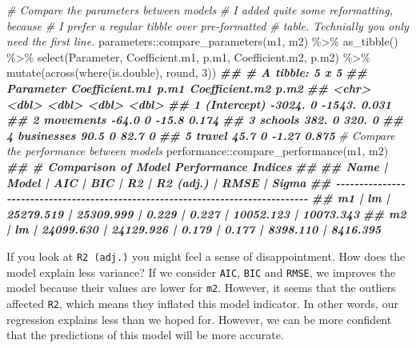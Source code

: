 \documentclass[
]{book}
\newenvironment{Shaded}{\begin{snugshade}}{\end{snugshade}}
\newcommand{\CommentTok}[1]{\textcolor[rgb]{0.56,0.35,0.01}{\textit{#1}}}
\newcommand{\DecValTok}[1]{\textcolor[rgb]{0.00,0.00,0.81}{#1}}
\newcommand{\DocumentationTok}[1]{\textcolor[rgb]{0.56,0.35,0.01}{\textbf{\textit{#1}}}}
\newcommand{\FunctionTok}[1]{\textcolor[rgb]{0.00,0.00,0.00}{#1}}
\newcommand{\NormalTok}[1]{#1}
\newcommand{\SpecialCharTok}[1]{\textcolor[rgb]{0.00,0.00,0.00}{#1}}
\begin{document}
\begin{Shaded}
\begin{Highlighting}[]
\CommentTok{\# Compare the parameters between models}
\CommentTok{\# I added quite some reformatting, because}
\CommentTok{\# I prefer a regular tibble over pre{-}formatted}
\CommentTok{\# table. Technially you only need the first line.}
\NormalTok{parameters}\SpecialCharTok{::}\FunctionTok{compare\_parameters}\NormalTok{(m1, m2) }\SpecialCharTok{\%\textgreater{}\%}
  \FunctionTok{as\_tibble}\NormalTok{() }\SpecialCharTok{\%\textgreater{}\%}
  \FunctionTok{select}\NormalTok{(Parameter, Coefficient.m1, p.m1, Coefficient.m2, p.m2) }\SpecialCharTok{\%\textgreater{}\%} 
  \FunctionTok{mutate}\NormalTok{(}\FunctionTok{across}\NormalTok{(}\FunctionTok{where}\NormalTok{(is.double), round, }\DecValTok{3}\NormalTok{))}
\DocumentationTok{\#\# \# A tibble: 5 x 5}
\DocumentationTok{\#\#   Parameter   Coefficient.m1  p.m1 Coefficient.m2  p.m2}
\DocumentationTok{\#\#   \textless{}chr\textgreater{}                \textless{}dbl\textgreater{} \textless{}dbl\textgreater{}          \textless{}dbl\textgreater{} \textless{}dbl\textgreater{}}
\DocumentationTok{\#\# 1 (Intercept)        {-}3024.      0       {-}1543.   0.031}
\DocumentationTok{\#\# 2 movements            {-}64.0     0         {-}15.8  0.174}
\DocumentationTok{\#\# 3 schools              382.      0         320.   0    }
\DocumentationTok{\#\# 4 businesses            90.5     0          82.7  0    }
\DocumentationTok{\#\# 5 travel                45.7     0          {-}1.27 0.875}
\CommentTok{\# Compare the performance between models}
\NormalTok{performance}\SpecialCharTok{::}\FunctionTok{compare\_performance}\NormalTok{(m1, m2)}
\DocumentationTok{\#\# \# Comparison of Model Performance Indices}
\DocumentationTok{\#\# }
\DocumentationTok{\#\# Name | Model |       AIC |       BIC |    R2 | R2 (adj.) |      RMSE |     Sigma}
\DocumentationTok{\#\# {-}{-}{-}{-}{-}{-}{-}{-}{-}{-}{-}{-}{-}{-}{-}{-}{-}{-}{-}{-}{-}{-}{-}{-}{-}{-}{-}{-}{-}{-}{-}{-}{-}{-}{-}{-}{-}{-}{-}{-}{-}{-}{-}{-}{-}{-}{-}{-}{-}{-}{-}{-}{-}{-}{-}{-}{-}{-}{-}{-}{-}{-}{-}{-}{-}{-}{-}{-}{-}{-}{-}{-}{-}{-}{-}{-}{-}{-}{-}{-}}
\DocumentationTok{\#\# m1   |    lm | 25279.519 | 25309.999 | 0.229 |     0.227 | 10052.123 | 10073.343}
\DocumentationTok{\#\# m2   |    lm | 24099.630 | 24129.926 | 0.179 |     0.177 |  8398.110 |  8416.395}
\end{Highlighting}
\end{Shaded}

If you look at \texttt{R2\ (adj.)} you might feel a sense of disappointment. How does the model explain less variance? If we consider \texttt{AIC}, \texttt{BIC} and \texttt{RMSE}, we improves the model because their values are lower for \texttt{m2}. However, it seems that the outliers affected \texttt{R2}, which means they inflated this model indicator. In other words, our regression explains less than we hoped for. However, we can be more confident that the predictions of this model will be more accurate.
\end{document}
